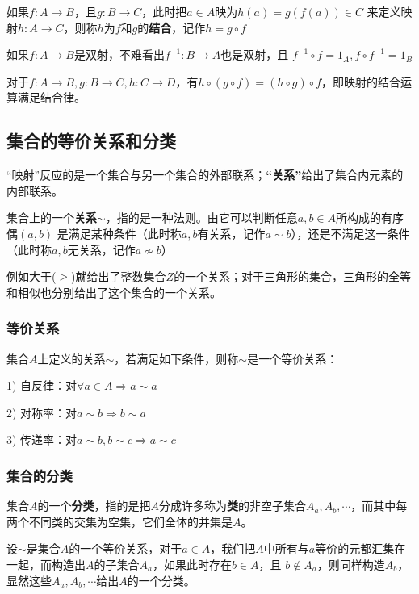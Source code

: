 \documentclass[12pt]{article}
\begin{document}
\begin{framed}
\small{
如果$f: A \rightarrow B$，且$g: B \rightarrow C$，此时把$a \in A$映为$h(a) = g(f(a)) \in C$ 来定义映射$h: A \rightarrow C$，则称$h$为$f$和$g$的\textbf{结合}，记作$h = g\circ f$

如果$f: A \rightarrow B$是双射，不难看出$f^{-1}: B \rightarrow A$也是双射，且 $f^{-1}\circ f = 1_A, f\circ f^{-1} = 1_B$

对于$f: A \rightarrow B, g: B \rightarrow C, h: C \rightarrow D$，有$h\circ (g\circ f) = (h\circ g)\circ f$，即映射的结合运算满足结合律。
}
\end{framed}

\subsection{集合的等价关系和分类}
“映射”反应的是一个集合与另一个集合的外部联系；\textbf{“关系”}给出了集合内元素的内部联系。

集合上的一个\textbf{关系$\sim$}，指的是一种法则。由它可以判断任意$a,b\in A$所构成的有序偶$(a,b)$ 是满足某种条件（此时称$a,b$有关系，记作$a\sim b$），还是不满足这一条件（此时称$a,b$无关系，记作$a\nsim b$）

\begin{framed}
\small {
例如大于($\ge$)就给出了整数集合$Z$的一个关系；对于三角形的集合，三角形的全等和相似也分别给出了这个集合的一个关系。
}
\end{framed}

\subsubsection{等价关系}
集合$A$上定义的关系$\sim$，若满足如下条件，则称$\sim$是一个等价关系：

1) 自反律：对$\forall a \in A \Rightarrow a \sim a$

2) 对称率：对$a \sim b \Rightarrow b \sim a$

3) 传递率：对$a \sim b, b \sim c\Rightarrow a \sim c$


\subsubsection{集合的分类}
集合$A$的一个\textbf{分类}，指的是把$A$分成许多称为\textbf{类}的非空子集合$A_a, A_b, \cdots $，而其中每两个不同类的交集为空集，它们全体的并集是$A$。

设$\sim$是集合$A$的一个等价关系，对于$a\in A$，我们把$A$中所有与$a$等价的元都汇集在一起，而构造出$A$的子集合$A_a$，如果此时存在$b \in A$，且 $b \notin A_a$，则同样构造$A_b$，显然这些$A_a, A_b, \cdots $给出$A$的一个分类。
\end{document}
